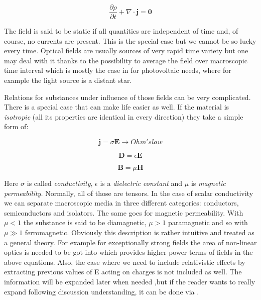 \begin{equation}
\frac{\partial\rho}{\partial t} + \nabla \cdot \mathbf{j = 0}
\end{equation}

The field is said to be static if all quantities are independent of time
and, of course, no currents are present. This is the special case but we
cannot be so lucky every time. Optical fields are usually sources of
very rapid time variety but one may deal with it thanks to the
possibility to average the field over macroscopic time interval which is
mostly the case in for photovoltaic needs, where for example the light
source is a distant star.

Relations for substances under influence of those fields can be very
complicated. There is a special case that can make life easier as well.
If the material is \emph{isotropic} (all its properties are identical in
every direction) they take a simple form of:

\begin{equation}
\mathbf{j} = \sigma\mathbf{E \rightarrow} Ohm's law
\end{equation}

\begin{equation}
\mathbf{D =}\epsilon\mathbf{E}
\end{equation}

\begin{equation}
\mathbf{B =}\mu\mathbf{H}
\end{equation}

Here \(\sigma\) is called \emph{conductivity}, \(\epsilon\) is a
\emph{dielectric constant} and \(\mu\) is \emph{magnetic permeability.}
Normally, all of those are tensors. In the case of scalar conductivity
we can separate macroscopic media in three different categories:
conductors, semiconductors and isolators. The same goes for magnetic
permeability. With \(\mu < 1\) the substance is said to be diamagnetic,
\(\mu > 1\) paramagnetic and so with \(\mu \gg 1\) ferromagnetic.
Obviously this description is rather intuitive and treated as a general
theory. For example for exceptionally strong fields the area of
non-linear optics is needed to be got into which provides higher power
terms of fields in the above equations. Also, the case where we need to
include relativistic effects by extracting previous values of E acting
on charges is not included as well. The information will be expanded
later when needed ,but if the reader wants to really expand following
discussion understanding, it can be done via \cite{Born1999} \cite{Jackson}.

